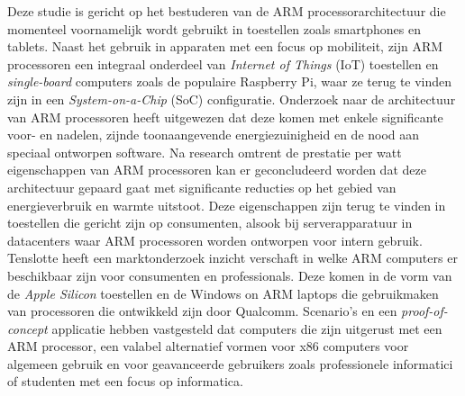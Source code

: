 Deze studie is gericht op het bestuderen van de ARM processorarchitectuur die momenteel voornamelijk wordt gebruikt in toestellen zoals smartphones en tablets. Naast het gebruik in apparaten met een focus op mobiliteit, zijn ARM processoren een integraal onderdeel van \textit{Internet of Things} (IoT) toestellen en \textit{single-board} computers zoals de populaire Raspberry Pi, waar ze terug te vinden zijn in een \textit{System-on-a-Chip} (SoC) configuratie. Onderzoek naar de architectuur van ARM processoren heeft uitgewezen dat deze komen met enkele significante voor- en nadelen, zijnde toonaangevende energiezuinigheid en de nood aan speciaal ontworpen software. Na research omtrent de prestatie per watt eigenschappen van ARM processoren kan er geconcludeerd worden dat deze architectuur gepaard gaat met significante reducties op het gebied van energieverbruik en warmte uitstoot. Deze eigenschappen zijn terug te vinden in toestellen die gericht zijn op consumenten, alsook bij serverapparatuur in datacenters waar ARM processoren worden ontworpen voor intern gebruik. Tenslotte heeft een marktonderzoek inzicht verschaft in welke ARM computers er beschikbaar zijn voor consumenten en professionals. Deze komen in de vorm van de \textit{Apple Silicon} toestellen en de Windows on ARM laptops die gebruikmaken van processoren die  ontwikkeld zijn door Qualcomm. Scenario’s en een \textit{proof-of-concept} applicatie hebben vastgesteld dat computers die zijn uitgerust met een ARM processor, een valabel alternatief vormen voor x86 computers voor algemeen gebruik en voor geavanceerde gebruikers zoals professionele informatici of studenten met een focus op informatica.
